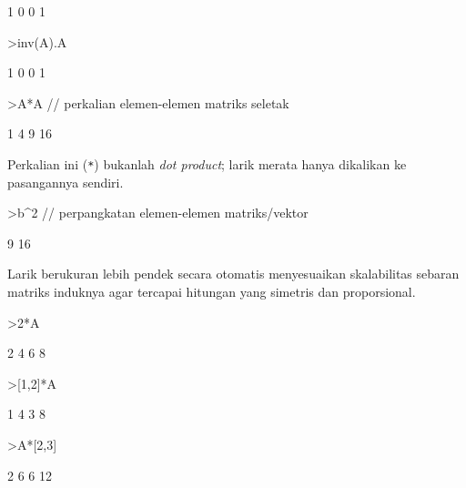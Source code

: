 \documentclass[a4paper,11pt,oneside,enabledeprecatedfontcommands]{scrbook}
\newenvironment{eulernotebook}{}{}
\newenvironment{eulercomment}{\par\medskip\noindent}{\par\medskip}
\begin{document}
\begin{eulernotebook}
\begin{eulerprompt}
\end{eulerprompt}
\begin{euleroutput}
            1             0 
            0             1 
\end{euleroutput}
\begin{eulerprompt}
>inv(A).A
\end{eulerprompt}
\begin{euleroutput}
            1             0 
            0             1 
\end{euleroutput}
\begin{eulerprompt}
>A*A // perkalian elemen-elemen matriks seletak
\end{eulerprompt}
\begin{euleroutput}
            1             4 
            9            16 
\end{euleroutput}
\begin{eulercomment}
Perkalian ini (\texttt{*}) bukanlah \emph{dot product}; larik merata hanya dikalikan ke pasangannya sendiri.
\end{eulercomment}
\begin{eulerprompt}
>b^2 // perpangkatan elemen-elemen matriks/vektor
\end{eulerprompt}
\begin{euleroutput}
            9 
           16 
\end{euleroutput}
\begin{eulercomment}
Larik berukuran lebih pendek secara otomatis menyesuaikan skalabilitas sebaran matriks induknya agar tercapai hitungan yang simetris dan proporsional.
\end{eulercomment}
\begin{eulerprompt}
>2*A
\end{eulerprompt}
\begin{euleroutput}
            2             4 
            6             8 
\end{euleroutput}
\begin{eulerprompt}
>[1,2]*A
\end{eulerprompt}
\begin{euleroutput}
            1             4 
            3             8 
\end{euleroutput}
\begin{eulerprompt}
>A*[2,3]
\end{eulerprompt}
\begin{euleroutput}
            2             6 
            6            12 
\end{euleroutput}

\end{eulernotebook}
\end{document}
